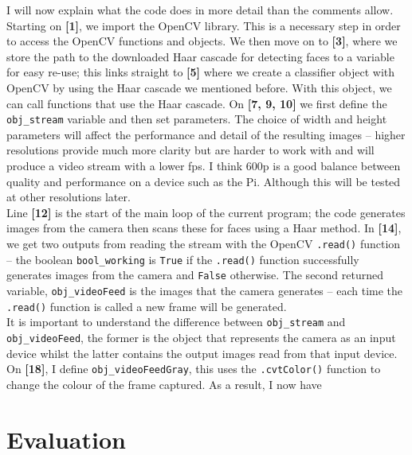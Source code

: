 \documentclass[9pt]{article}
\begin{document}
I will now explain what the code does in more detail than the comments allow. Starting on \textbf{[1]}, we import the OpenCV library. This is a necessary step in order to access the OpenCV functions and objects. We then move on to \textbf{[3]}, where we store the path to the downloaded Haar cascade for detecting faces to a variable for easy re-use; this links straight to \textbf{[5]} where we create a classifier object with OpenCV by using the Haar cascade we mentioned before. With this object, we can call functions that use the Haar cascade. On \textbf{[7, 9, 10]} we first define the \texttt{obj\_stream} variable and then set parameters. The choice of width and height parameters will affect the performance and detail of the resulting images -- higher resolutions provide much more clarity but are harder to work with and will produce a video stream with a lower fps. I think 600p is a good balance between quality and performance on a device such as the Pi. Although this will be tested at other resolutions later. \\
Line \textbf{[12]} is the start of the main loop of the current program; the code generates images from the camera then scans these for faces using a Haar method. In \textbf{[14]}, we get two outputs from reading the stream with the OpenCV \texttt{.read()} function -- the boolean \texttt{bool\_working} is \texttt{True} if the \texttt{.read()} function successfully generates images from the camera and \texttt{False} otherwise. The second returned variable, \texttt{obj\_videoFeed} is the images that the camera generates -- each time the \texttt{.read()} function is called a new frame will be generated.\\
It is important to understand the difference between \texttt{obj\_stream} and \texttt{obj\_videoFeed}, the former is the object that represents the camera as an input device whilst the latter contains the output images read from that input device.\\
On \textbf{[18]}, I define \texttt{obj\_videoFeedGray}, this uses the \texttt{.cvtColor()} function to change the colour of the frame captured. As a result, I now have 






\newpage
\section{Evaluation}
\end{document}
